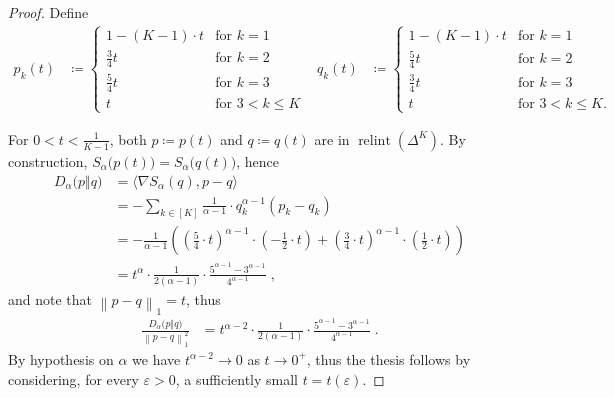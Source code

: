 \documentclass[11pt,oneside,a4paper]{article}
\newcommand{\e}{\varepsilon}
\newcommand{\lrb}[1]{\left(#1\right)}
\newcommand{\brb}[1]{\bigl(#1\bigr)}
\newcommand{\lno}[1]{\left\lVert#1\right\rVert}
\theoremstyle{plain}
\theoremstyle{definition}
\theoremstyle{remark}
\newcommand{\simplex}[1]{\Delta^{#1}}
\DeclareMathOperator*{\relint}{relint}
\begin{document}
\begin{proof}
Define 
\begin{align*}   
    p_k(t) 
&
\coloneq 
    \begin{cases}
            1 - (K-1) \cdot t
        &
            \text{for $k = 1$}
        \\
            \frac{3}{4}t 
        &
            \text{for $k = 2$}
        \\
            \frac{5}{4}t 
        &
            \text{for $k = 3$}
        \\
            t
        &
            \text{for $3 <k \le K$}
    \end{cases}
&
    q_k(t)
& \coloneq 
    \begin{cases}
            1 - (K-1) \cdot t
        &
            \text{for $k = 1$}
        \\
            \frac{5}{4}t 
        &
            \text{for $k = 2$}
        \\
            \frac{3}{4}t 
        &
            \text{for $k = 3$}
        \\
            t
        &
            \text{for $3 <k \le K$.}
    \end{cases}
\end{align*}

For $0 < t <\frac{1}{K-1}$, both $p \coloneq p(t)$ and $q \coloneqq q(t)$ are in $\relint\lrb{\simplex{K}}$.
By construction, $S_{\alpha}\brb{p(t)} = S_{\alpha}\brb{q(t)}$, hence
\begin{align*}
    D_\alpha\brb{p\Vert q}
&=
    \langle\nabla S_{\alpha}(q),p-q\rangle
\\
&=
    - \sum_{k \in[K]} \frac{1}{\alpha-1} \cdot  q_k^{\alpha-1} \lrb{p_k-q_k}
\\
&=
    - \frac{1}{\alpha-1} \lrb{ 
            \lrb{\frac{5}{4} \cdot  t }^{\alpha-1} \cdot  \lrb{- \frac{1}{2} \cdot t}
        +
            \lrb{\frac{3}{4} \cdot t }^{\alpha-1} \cdot \lrb{\frac{1}{2} \cdot t}
        }
\\
&=
    t^{\alpha} 
    \cdot 
    \frac{1}{2(\alpha-1)}
    \cdot
    \frac{5 ^{\alpha-1} -   {3}^{\alpha - 1}}{4^{\alpha-1}}\;,
\end{align*}
and note that $\lno{p - q}_1 = t$, thus
\begin{align*}
    \frac{D_\alpha\brb{p\Vert q}}{ \lno{p - q}_1^2}
&
=
    t^{\alpha - 2} 
\cdot 
    \frac{1}{2(\alpha-1)} 
\cdot 
    \frac{5 ^{\alpha-1} -   {3}^{\alpha - 1}}{4^{\alpha-1}}\;.
\end{align*}
By hypothesis on $\alpha$ we have $t^{\alpha - 2} \to 0$ as $t \to 0^+$, thus the thesis follows by considering, for every $\e >0$, a sufficiently small $t = t(\e)$.
\end{proof}
\end{document}
